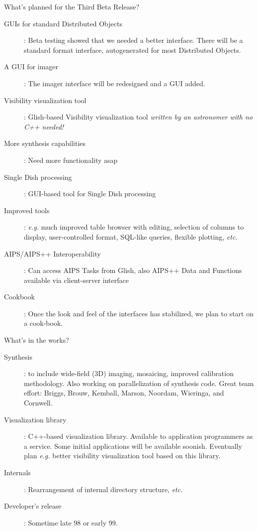 \documentclass[11pt]{article}
\begin{document}
\begin{slide}{What's planned for the Third Beta Release?}
\begin{description}
\item[GUIs for standard Distributed Objects]: Beta testing showed that
we needed a better interface. There will be a standard format interface,
autogenerated for most Distributed Objects.
\item[A GUI for imager]: The imager interface will be redesigned
and a GUI added.
\item[Visibility visualization tool]: Glish-based Visibility visualization
tool {\em written by an astronomer with no C++ needed!}
\item[More synthesis capabilities]: Need more functionality asap
\item[Single Dish processing]: GUI-based tool for Single Dish processing
\item[Improved tools]: {\em e.g.} much improved table browser with editing,
selection of columns to display, user-controlled format, SQL-like queries,
flexible plotting, {\em etc.}
\item[AIPS/AIPS++ Interoperability]: Can access AIPS Tasks from Glish,
also AIPS++ Data and Functions available via client-server interface
\item[Cookbook]: Once the look and feel of the interfaces has stabilized,
we plan to start on a cook-book.
\end{description}
\end{slide}

\begin{slide}{What's in the works?}
\begin{description}
\item[Synthesis]: to include wide-field (3D) imaging, mosaicing, improved
calibration methodology. Also working on parallelization of synthesis code.
Great team effort: Briggs, Brouw, Kemball, Marson, Noordam, Wieringa, and 
Cornwell.
\item[Visualization library]: C++-based visualization library. Available
to application programmers as a service. Some initial applications will
be available soonish. Eventually plan {\em e.g.} better visibility
visualization tool based on this library.
\item[Internals]: Rearrangement of internal directory structure, {\em etc.}
\item[Developer's release]: Sometime late 98 or early 99.
\end{description}
\end{slide}
\end{document}
